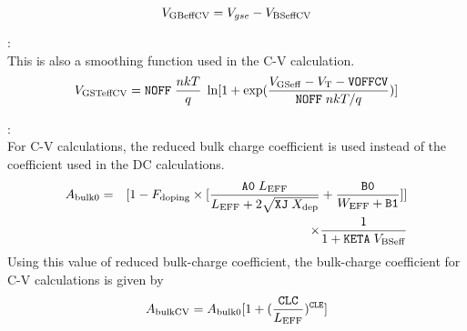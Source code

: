 \documentclass{article}
\begin{document}
\begin{equation}
V_{\rm{GBeffCV}} = V_{gse} - V_{\rm{BSeffCV}}
\end{equation}

:\\
This is also a smoothing function used in the C-V calculation.
\begin{equation}
V_{\rm{GSTeffCV}} = \texttt{NOFF}\;{nkT \over q}\; \ln[1 +
\exp({V_{\rm{GSeff}} - V_{\rm{T}} - \texttt{VOFFCV} \over
\texttt{NOFF} \;nkT/q})]
\end{equation}

:\\
For C-V calculations, the reduced bulk charge coefficient is used
instead of the coefficient used in the DC calculations.
\begin{eqnarray}
A_{\rm{bulk0}} & = & [1 - F_{\rm{doping}} \times
[{\texttt{A0}\;L_{\rm{EFF}} \over
L_{\rm{EFF}} + 2\sqrt{\texttt{XJ}\;X_{\rm{dep}}}} + {\texttt{B0} \over W_{\rm{EFF}} + \texttt{B1}}]] \nonumber \\
           & & \times {1 \over 1 + \texttt{KETA}\;V_{\rm{BSeff}}}
\end{eqnarray}
Using this value of reduced bulk-charge coefficient, the
bulk-charge coefficient for C-V calculations is given by
\begin{equation}
A_{\rm{bulkCV}} = A_{\rm{bulk0}}[1 + ({\texttt{CLC} \over
L_{\rm{EFF}}})^{\texttt{CLE}}]
\end{equation}
\end{document}

